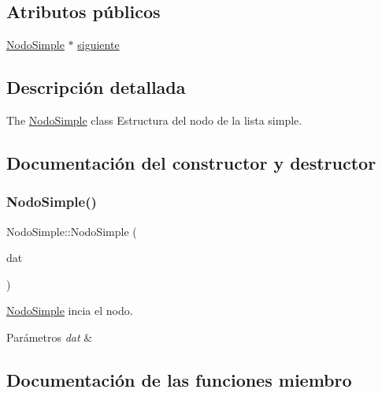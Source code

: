 \subsection*{Atributos públicos}
\begin{DoxyCompactItemize}
\item 
\mbox{\hyperlink{class_nodo_simple}{Nodo\+Simple}} $\ast$ \mbox{\hyperlink{class_nodo_simple_a7ef0a1b5d9ee22ee78dfbf29e25e8450}{siguiente}}
\end{DoxyCompactItemize}


\subsection{Descripción detallada}
The \mbox{\hyperlink{class_nodo_simple}{Nodo\+Simple}} class Estructura del nodo de la lista simple. 

\subsection{Documentación del constructor y destructor}
\mbox{\label{class_nodo_simple_acde7a8d315007bd580fbff42eaa69c9c}} 
\subsubsection{\texorpdfstring{Nodo\+Simple()}{NodoSimple()}}
{\footnotesize\ttfamily Nodo\+Simple\+::\+Nodo\+Simple (\begin{DoxyParamCaption}\item[{Q\+String}]{dat }\end{DoxyParamCaption})\hspace{0.3cm}{\ttfamily [inline]}}



\mbox{\hyperlink{class_nodo_simple}{Nodo\+Simple}} incia el nodo. 


\begin{DoxyParams}{Parámetros}
{\em dat} & \\
\hline
\end{DoxyParams}


\subsection{Documentación de las funciones miembro}
\mbox{\label{class_nodo_simple_a8e2cf29c0b691d7c81a4a1f2c9414863}} 
